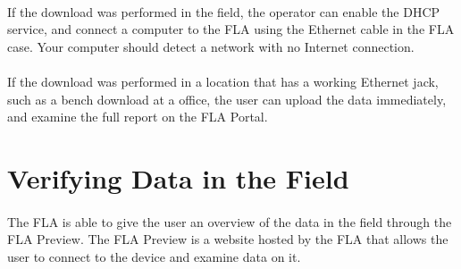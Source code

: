 \documentclass[11pt]{article}
\begin{document}
\paragraph{  }
If the download was performed in the field, the operator can enable the DHCP service, and connect a computer to the FLA using the Ethernet cable in the FLA case. Your computer should detect a network with no Internet connection.
\paragraph{  }
If the download was performed in a location that has a working Ethernet jack, such as a bench download at a office, the user can upload the data immediately, and examine the full report on the FLA Portal.

\section{Verifying Data in the Field}
\paragraph{  }
The FLA is able to give the user an overview of the data in the field through the FLA Preview. The FLA Preview is a website hosted by the FLA that allows the user to connect to the device and examine data on it.
\end{document}
